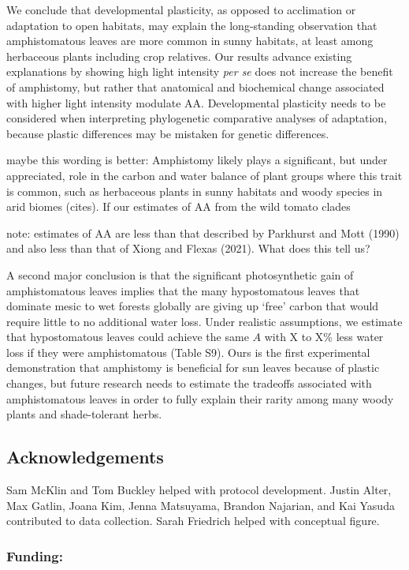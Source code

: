 \documentclass[
  letterpaper,
  DIV=11,
  numbers=noendperiod]{scrartcl}
\newcommand{\aax}{$\mathrm{AA}$}
\begin{document}
We conclude that developmental plasticity, as opposed to acclimation or
adaptation to open habitats, may explain the long-standing observation
that amphistomatous leaves are more common in sunny habitats, at least
among herbaceous plants including crop relatives. Our results advance
existing explanations by showing high light intensity \emph{per se} does
not increase the benefit of amphistomy, but rather that anatomical and
biochemical change associated with higher light intensity modulate
\aax{}. Developmental plasticity needs to be considered when
interpreting phylogenetic comparative analyses of adaptation, because
plastic differences may be mistaken for genetic differences.

maybe this wording is better: Amphistomy likely plays a significant, but
under appreciated, role in the carbon and water balance of plant groups
where this trait is common, such as herbaceous plants in sunny habitats
and woody species in arid biomes (cites). If our estimates of AA from
the wild tomato clades

note: estimates of AA are less than that described by Parkhurst and Mott
(1990) and also less than that of Xiong and Flexas (2021). What does
this tell us?

A second major conclusion is that the significant photosynthetic gain of
amphistomatous leaves implies that the many hypostomatous leaves that
dominate mesic to wet forests globally are giving up `free' carbon that
would require little to no additional water loss. Under realistic
assumptions, we estimate that hypostomatous leaves could achieve the
same \(A\) with X to X\% less water loss if they were amphistomatous
(Table S9). Ours is the first experimental demonstration that amphistomy
is beneficial for sun leaves because of plastic changes, but future
research needs to estimate the tradeoffs associated with amphistomatous
leaves in order to fully explain their rarity among many woody plants
and shade-tolerant herbs.

\subsection{Acknowledgements}\label{acknowledgements}

Sam McKlin and Tom Buckley helped with protocol development. Justin
Alter, Max Gatlin, Joana Kim, Jenna Matsuyama, Brandon Najarian, and Kai
Yasuda contributed to data collection. Sarah Friedrich helped with
conceptual figure.

\subsubsection{Funding:}\label{funding}
\end{document}
